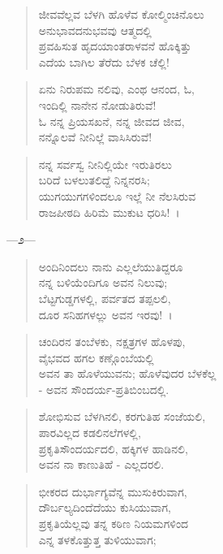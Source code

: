 \begin{verse}
ಜೀವವೆಲ್ಲವ ಬೆಳಗಿ ಹೊಳೆವ ಕೋಲ್ಮಿಂಚಿನೊಲು\\ಅನುಭಾವದನುಭವವು ಆತ್ಮದಲ್ಲಿ\\ಪ್ರವಹಿಸುತ ಹೃದಯಾಂತರಾಳವನೆ ಹೊಕ್ಕಿತ್ತು\\ಎದೆಯ ಬಾಗಿಲ ತೆರೆದು ಬೆಳಕ ಚೆಲ್ಲಿ! 
\end{verse}

\begin{verse}
ಏನು ನಿರುಪಮ ನಲಿವು, ಎಂಥ ಆನಂದ, ಓ,\\ಇಂದಿಲ್ಲಿ ನಾನೇನ ನೋಡುತಿರುವೆ!\\ಓ ನನ್ನ ಪ್ರಿಯಸಖನೆ, ನನ್ನ ಜೀವದ ಜೀವ,\\ನನ್ನೊಲವೆ ನೀನಿಲ್ಲೆ ವಾಸಿಸಿರುವೆ!
\end{verse}

\begin{verse}
ನನ್ನ ಸರ್ವಸ್ವ ನೀನಿಲ್ಲಿಯೇ ಇರುತಿರಲು\\ಬರಿದೆ ಬಳಲುತಲಿದ್ದೆ ನಿನ್ನನರಸಿ;\\ಯುಗಯುಗಗಳಿಂದಲೂ ಇಲ್ಲೆ ನೀ ನೆಲಸಿರುವ\\ರಾಜಪೀಠದಿ ಹಿರಿಮೆ ಮುಕುಟ ಧರಿಸಿ!~।
\end{verse}

\begin{center}
—೨—
\end{center}

\begin{verse}
ಅಂದಿನಿಂದಲು ನಾನು ಎಲ್ಲಲೆಯುತಿದ್ದರೂ\\ನನ್ನ ಬಳಿಯೆಂದಿಗೂ ಅವನ ನಿಲುವು; \\ಬೆಟ್ಟಗುಡ್ಡಗಳಲ್ಲಿ, ಪರ್ವತದ ತಪ್ಪಲಲಿ,\\ದೂರ ಸನಿಹಗಳಲ್ಲು ಅವನ ಇರವು!~।
\end{verse}

\begin{verse}
ಚಂದಿರನ ತಂಬೆಳಕು, ನಕ್ಷತ್ರಗಳ ಹೊಳಪು,\\ವೈಭವದ ಹಗಲ ಕಣ್ಗೊಂಬೆಯಲ್ಲಿ\\ಅವನ ತಾ ಹೊಳೆಯುವನು; ಹೊಳೆವುದರ ಬೆಳಕೆಲ್ಲ\\- ಅವನ ಸೌಂದರ್ಯ-ಪ್ರತಿಬಿಂಬದಲ್ಲಿ.
\end{verse}

\begin{verse}
ಶೋಭಿಸುವ ಬೆಳಗಿನಲಿ, ಕರಗುತಿಹ ಸಂಜೆಯಲಿ,\\ಪಾರವಿಲ್ಲದ ಕಡಲಿನಲೆಗಳಲ್ಲಿ,\\ಪ್ರಕೃತಿಸೌಂದರ್ಯದಲಿ, ಹಕ್ಕಿಗಳ ಹಾಡಿನಲಿ,\\ಅವನ ನಾ ಕಾಣುತಿಹೆ - ಎಲ್ಲದರಲಿ. 
\end{verse}

\begin{verse}
ಭೀಕರದ ದುರ್ಭಾಗ್ಯವೆನ್ನ ಮುಸುಕಿರುವಾಗ,\\ದೌರ್ಬಲ್ಯದಿಂದೆದೆಯು ಕುಸಿಯುವಾಗ,\\ಪ್ರಕೃತಿಯೆಲ್ಲವು ತನ್ನ ಕಠಿಣ ನಿಯಮಗಳಿಂದ\\ಎನ್ನ ತಳಕೊತ್ತುತ್ತ ತುಳಿಯುವಾಗ;
\end{verse}

